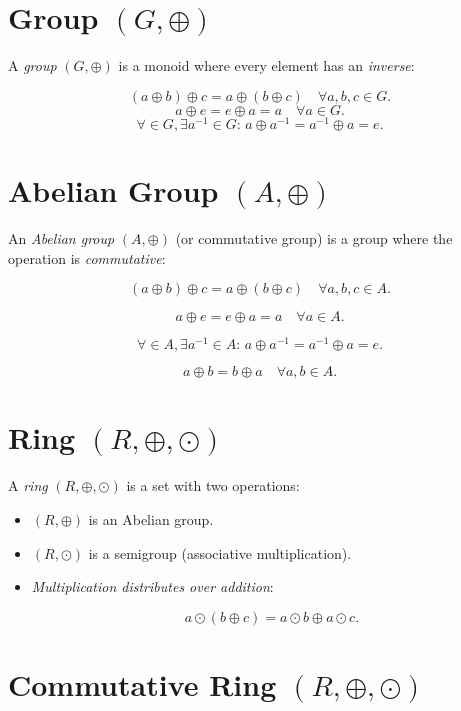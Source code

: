 \section{Group \texorpdfstring{\((G, \oplus)\)}{}}

A \emph{group} \((G, \oplus)\) is a monoid where every element has an \emph{inverse}:


\[
	(a \oplus b) \oplus c = a \oplus (b \oplus c) \quad \forall a, b, c \in G.
\]
\[
	a \oplus e = e \oplus a = a \quad \forall a \in G.
\]
\[
	\forall \in G, \exists a^{-1} \in G: \, a \oplus a^{-1} = a^{-1} \oplus a = e.
\]

\section{Abelian Group \texorpdfstring{\((A, \oplus)\)}{}}

An \emph{Abelian group} \((A, \oplus)\) (or commutative group) is a group where the operation is \emph{commutative}:


\[
	(a \oplus b) \oplus c = a \oplus (b \oplus c) \quad \forall a, b, c \in A.
\]

\[
	a \oplus e = e \oplus a = a \quad \forall a \in A.
\]

\[
	\forall \in A, \exists a^{-1} \in A: \, a \oplus a^{-1} = a^{-1} \oplus a = e.
\]

\[
	a \oplus b = b \oplus a \quad \forall a, b \in A.
\]

\section{Ring \texorpdfstring{\((R, \oplus, \odot)\)}{}}

A \emph{ring} \((R, \oplus, \odot)\) is a set with two operations:

\begin{itemize}

	\item \((R, \oplus)\) is an Abelian group.

	\item \((R, \odot)\) is a semigroup (associative multiplication).

	\item \emph{Multiplication distributes over addition}:

	      \[
		      a \odot (b \oplus c) = a \odot b \oplus a \odot c.
	      \]
\end{itemize}

\section{Commutative Ring \texorpdfstring{\((R, \oplus, \odot)\)}{}}

